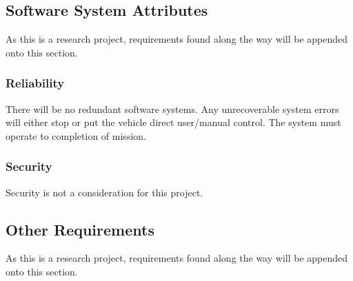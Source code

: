 \documentclass[compsoc,draftclsnofoot,onecolumn,10pt]{IEEEtran}
\begin{document}
\subsection{Software System Attributes}
As this is a research project, requirements found along the way will be appended onto this section. 

\subsubsection{Reliability}
There will be no redundant software systems. 
Any unrecoverable system errors will either stop or put the vehicle direct user/manual control.
The system must operate to completion of mission.

\subsubsection{Security}
Security is not a consideration for this project. 

\subsection{Other Requirements}
As this is a research project, requirements found along the way will be appended onto this section. 






\end{document}

